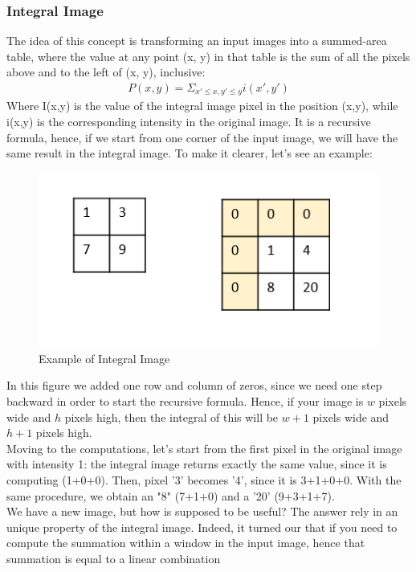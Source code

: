         \subsubsection{Integral Image}
            The idea of this concept is transforming an input images into a summed-area table, where the value at any point (x, y) in that table is the sum of all the pixels above and to the left of (x, y), inclusive:
            \begin{align}
                P(x,y) = \Sigma_{x' \leq x, y' \leq y} i(x',y')
            \end{align}
            Where I(x,y) is the value of the integral image pixel in the position (x,y), while i(x,y) is the corresponding intensity in the original image. It is a recursive formula, hence, if we start from one corner of the input image, we will have the same result in the integral image. 
            To make it clearer, let’s see an example:
            \begin{figure}[H]
                \centering
                \includegraphics[width=0.6\linewidth]{img/example_integral.png}
                \caption{Example of Integral Image}
            \end{figure}
            In this figure we added one row and column of zeros, since we need one step backward in order to start the recursive formula. Hence, if your image is $w$ pixels wide and $h$ pixels high, then the integral of this will be $w+1$ pixels wide and $h+1$ pixels high. \\ 
            \vspace{3mm}
            Moving to the computations, let's start from the first pixel in the original image with intensity 1: the integral image returns exactly the same value, since it is computing (1+0+0). Then, pixel '3' becomes '4', since it is 3+1+0+0. With the same procedure, we obtain an 
            "8" (7+1+0) and a '20' (9+3+1+7). \\ 
            \vspace{3mm}
            We have a new image, but how is supposed to be useful? The answer rely in an unique property of the integral image. Indeed, it turned our that if you need to compute the summation within a window in the input image, hence that summation is equal to a linear combination 
